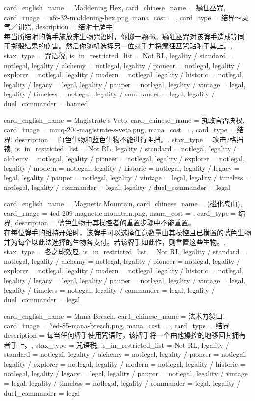 \documentclass[lang = cn, color = black, 10pt]{AllThatStax}
\begin{document}
\card
{
	card_english_name = {Maddening Hex},
	card_chinese_name = {癫狂巫咒},
	card_image = afc-32-maddening-hex.png,
	mana_cost = ,
	card_type = 结界～灵气／诅咒,
	description = {结附于牌手\\
每当所结附的牌手施放非生物咒语时，你掷一颗d6。癫狂巫咒对该牌手造成等同于掷骰结果的伤害。然后你随机选择另一位对手并将癫狂巫咒贴附于其上。},
	stax_type = 咒语税,
	is_in_restricted_list = Not RL,
	legality / standard = notlegal,
	legality / alchemy = notlegal,
	legality / pioneer = notlegal,
	legality / explorer = notlegal,
	legality / modern = notlegal,
	legality / historic = notlegal,
	legality / legacy = legal,
	legality / pauper = notlegal,
	legality / vintage = legal,
	legality / timeless = notlegal,
	legality / commander = legal,
	legality / duel_commander = banned
}

\card
{
	card_english_name = {Magistrate's Veto},
	card_chinese_name = {执政官否决权},
	card_image = mmq-204-magistrate-s-veto.png,
	mana_cost = ,
	card_type = 结界,
	description = {白色生物和蓝色生物不能进行阻挡。},
	stax_type = 攻击/格挡锁,
	is_in_restricted_list = Not RL,
	legality / standard = notlegal,
	legality / alchemy = notlegal,
	legality / pioneer = notlegal,
	legality / explorer = notlegal,
	legality / modern = notlegal,
	legality / historic = notlegal,
	legality / legacy = legal,
	legality / pauper = notlegal,
	legality / vintage = legal,
	legality / timeless = notlegal,
	legality / commander = legal,
	legality / duel_commander = legal
}

\card
{
	card_english_name = {Magnetic Mountain},
	card_chinese_name = {(磁化岛山)},
	card_image = 4ed-209-magnetic-mountain.png,
	mana_cost = ,
	card_type = 结界,
	description = {蓝色生物于其操控者的重置步骤中不能重置。\\
在每位牌手的维持开始时，该牌手可以选择任意数量由其操控且已横置的蓝色生物并为每个以此法选择的生物各支付。若该牌手如此作，则重置这些生物。},
	stax_type = 冬之球效应,
	is_in_restricted_list = Not RL,
	legality / standard = notlegal,
	legality / alchemy = notlegal,
	legality / pioneer = notlegal,
	legality / explorer = notlegal,
	legality / modern = notlegal,
	legality / historic = notlegal,
	legality / legacy = legal,
	legality / pauper = notlegal,
	legality / vintage = legal,
	legality / timeless = notlegal,
	legality / commander = legal,
	legality / duel_commander = legal
}

\card
{
	card_english_name = {Mana Breach},
	card_chinese_name = {法术力裂口},
	card_image = 7ed-85-mana-breach.png,
	mana_cost = ,
	card_type = 结界,
	description = {每当任何牌手使用咒语时，该牌手将一个由他操控的地移回其拥有者手上。},
	stax_type = 咒语税,
	is_in_restricted_list = Not RL,
	legality / standard = notlegal,
	legality / alchemy = notlegal,
	legality / pioneer = notlegal,
	legality / explorer = notlegal,
	legality / modern = notlegal,
	legality / historic = notlegal,
	legality / legacy = legal,
	legality / pauper = notlegal,
	legality / vintage = legal,
	legality / timeless = notlegal,
	legality / commander = legal,
	legality / duel_commander = legal
}
\end{document}
